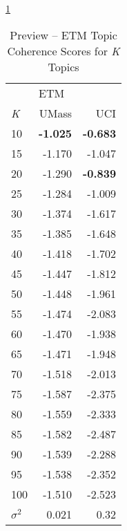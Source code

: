 \documentclass[letterpaper,12pt]{article}
\begin{document}
\ref{tab:etm_preview_tc}
\begin{table}
	\caption{\label{tab:etm_preview_tc} Preview -- ETM Topic Coherence Scores for \emph{K} Topics}
	\begin{center}
		\begin{tabular}{lrr}
			\toprule
			{} & \multicolumn{2}{l}{ETM} \\
			\emph{K} &  UMass &    UCI \\
			\midrule
			10  & \textbf{-1.025} & \textbf{-0.683} \\
			15  & -1.170 & -1.047 \\
			20  & -1.290 & \textbf{-0.839} \\
			25  & -1.284 & -1.009 \\
			30  & -1.374 & -1.617 \\
			35  & -1.385 & -1.648 \\
			40  & -1.418 & -1.702 \\
			45  & -1.447 & -1.812 \\
			50  & -1.448 & -1.961 \\
			55  & -1.474 & -2.083 \\
			60  & -1.470 & -1.938 \\
			65  & -1.471 & -1.948 \\
			70  & -1.518 & -2.013 \\
			75  & -1.587 & -2.375 \\
			80  & -1.559 & -2.333 \\
			85  & -1.582 & -2.487 \\
			90  & -1.539 & -2.288 \\
			95  & -1.538 & -2.352 \\
			100 & -1.510 & -2.523 \\
			\midrule
			$\sigma^2$ & 0.021 & 0.32 \\
			\bottomrule
			\end{tabular}
	\end{center}
\end{table}
\end{document}
